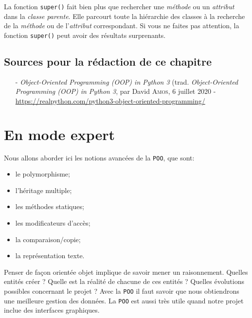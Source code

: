 \documentclass[a4paper,12pt]{book}
\begin{document}
La fonction \texttt{super()} fait bien plus que rechercher une \textit{méthode} ou un \textit{attribut} dans la \textit{classe parente}. Elle parcourt toute la hiérarchie des classes à la recherche de la \textit{méthode} ou de l'\textit{attribut} correspondant. Si vous ne faites pas attention, la fonction \texttt{super()} peut avoir des résultats surprenants.
\medskip

\section*{Sources pour la rédaction de ce chapitre}
\begin{itemize}
	\item[-] \textit{Object-Oriented Programming (OOP) in Python 3} (trad. \textit{Object-Oriented Programming (OOP) in Python 3}, par David \textsc{Amos}, 6 juillet 2020 - \\ \url{https://realpython.com/python3-object-oriented-programming/}
\end{itemize}
\medskip

\chapter{En mode expert}
Nous allons aborder ici les notions avancées de la \texttt{POO}, que sont:
\begin{itemize}
	\item le polymorphisme;
	\item l'héritage multiple;
	\item les méthodes statiques;
	\item les modificateurs d'accès;
	\item la comparaison/copie;
	\item la représentation texte.
\end{itemize}
\medskip

Penser de façon orientée objet implique de savoir mener un raisonnement. Quelles entités créer ? Quelle est la réalité de chacune de ces entités ? Quelles évolutions possibles concernant le projet ? Avec la \texttt{POO} il faut savoir que nous obtiendrons une meilleure gestion des données. La \texttt{POO} est aussi très utile quand notre projet inclue des interfaces graphiques.
\medskip
\end{document}

